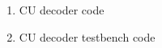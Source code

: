 
\addchap{\appendixPhrase}
{\Large
	\begin{enumerate}[label=\Alph*.]
		\item CU decoder code 
		\item CU decoder testbench code
	\end{enumerate}
}
\pagebreak
%
%

